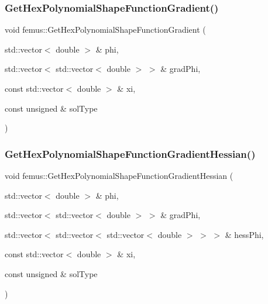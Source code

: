 \subsubsection{\texorpdfstring{Get\+Hex\+Polynomial\+Shape\+Function\+Gradient()}{GetHexPolynomialShapeFunctionGradient()}}
{\footnotesize\ttfamily void femus\+::\+Get\+Hex\+Polynomial\+Shape\+Function\+Gradient (\begin{DoxyParamCaption}\item[{std\+::vector$<$ double $>$ \&}]{phi,  }\item[{std\+::vector$<$ std\+::vector$<$ double $>$ $>$ \&}]{grad\+Phi,  }\item[{const std\+::vector$<$ double $>$ \&}]{xi,  }\item[{const unsigned \&}]{sol\+Type }\end{DoxyParamCaption})}

\mbox{\label{namespacefemus_a1d9ba028f39ef32f218f17e03d0bbe53}} 
\subsubsection{\texorpdfstring{Get\+Hex\+Polynomial\+Shape\+Function\+Gradient\+Hessian()}{GetHexPolynomialShapeFunctionGradientHessian()}}
{\footnotesize\ttfamily void femus\+::\+Get\+Hex\+Polynomial\+Shape\+Function\+Gradient\+Hessian (\begin{DoxyParamCaption}\item[{std\+::vector$<$ double $>$ \&}]{phi,  }\item[{std\+::vector$<$ std\+::vector$<$ double $>$ $>$ \&}]{grad\+Phi,  }\item[{std\+::vector$<$ std\+::vector$<$ std\+::vector$<$ double $>$ $>$ $>$ \&}]{hess\+Phi,  }\item[{const std\+::vector$<$ double $>$ \&}]{xi,  }\item[{const unsigned \&}]{sol\+Type }\end{DoxyParamCaption})}

\mbox{\label{namespacefemus_a434f4672190f9d15cbc5e65705836bda}} 
